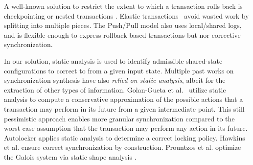 %
A well-known solution to restrict the extent to which a transaction rolls back is checkpointing \cite{spaa08a,Egwutuoha:2013}
or nested transactions \cite{ont,beeri}.
Elastic transactions~\cite{FGG:DISC09} avoid wasted work by splitting into multiple pieces.  
%
The Push/Pull model \cite{KoskinenP15} also uses local/shared logs, and is flexible enough to express rollback-based transactions but nor corrective synchronization.

In our solution, static analysis is used to identify admissible shared-state configurations to correct to from a given input state. Multiple past works on synchronization synthesis have also \emph{relied on static analysis}, albeit for the extraction of other types of information. 
%
Golan-Gueta et al.~\cite{GRSY:PLDI13} utilize static analysis to compute a conservative approximation of the possible actions that a transaction may perform in its future from a given intermediate point. This still pessimistic approach enables more granular synchronization compared to the worst-case assumption that the transaction may perform any action in its future.
%
Autolocker \cite{popl/McCloskeyZGB06} applies static analysis to determine a correct locking policy.
%
Hawkins et al. \cite{HawkinsAFRS12}
ensure correct synchronization by construction.
%
Prountzos et al. \cite{PrountzosMPM11} optimize the Galois system \cite{Galois} via static shape analysis \cite{MoolyToplas}.

